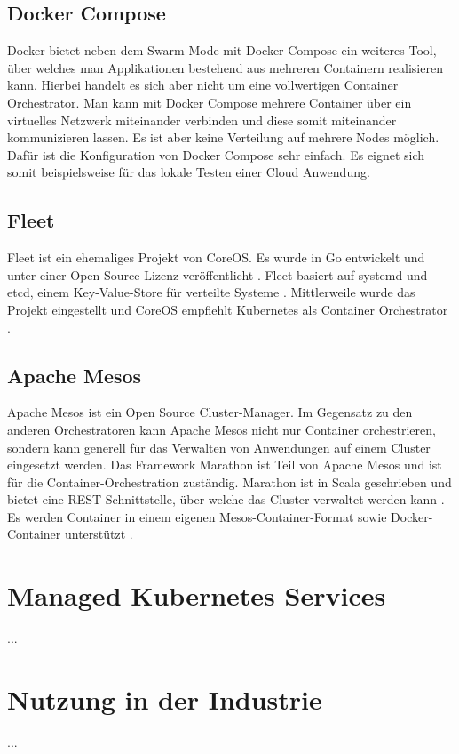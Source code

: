 \subsection{Docker Compose}
Docker bietet neben dem Swarm Mode mit Docker Compose ein weiteres Tool, über welches man Applikationen bestehend aus mehreren Containern realisieren kann. Hierbei handelt es sich aber nicht um eine vollwertigen Container Orchestrator. Man kann mit Docker Compose mehrere Container über ein virtuelles Netzwerk miteinander verbinden und diese somit miteinander kommunizieren lassen. Es ist aber keine Verteilung auf mehrere Nodes möglich. Dafür ist die Konfiguration von Docker Compose sehr einfach. Es eignet sich somit beispielsweise für das lokale Testen einer Cloud Anwendung.

\subsection{Fleet}
Fleet ist ein ehemaliges Projekt von CoreOS. Es wurde in Go entwickelt und unter einer Open Source Lizenz veröffentlicht \cite{noauthor_fleet_2021}. Fleet basiert auf systemd und etcd, einem Key-Value-Store für verteilte Systeme \cite{noauthor_etcd_2021}. Mittlerweile wurde das Projekt eingestellt und CoreOS empfiehlt Kubernetes als Container Orchestrator \cite{noauthor_fleet_2021}.

\subsection{Apache Mesos}
Apache Mesos ist ein Open Source Cluster-Manager. Im Gegensatz zu den anderen Orchestratoren kann Apache Mesos nicht nur Container orchestrieren, sondern kann generell für das Verwalten von Anwendungen auf einem Cluster eingesetzt werden. Das Framework Marathon ist Teil von Apache Mesos und ist für die Container-Orchestration zuständig. Marathon ist in Scala geschrieben und bietet eine REST-Schnittstelle, über welche das Cluster verwaltet werden kann \cite{noauthor_marathon_2021}. Es werden Container in einem eigenen Mesos-Container-Format sowie Docker-Container unterstützt \cite{noauthor_mesosphere_2021}.

\section{Managed Kubernetes Services}
...
\section{Nutzung in der Industrie}
...


